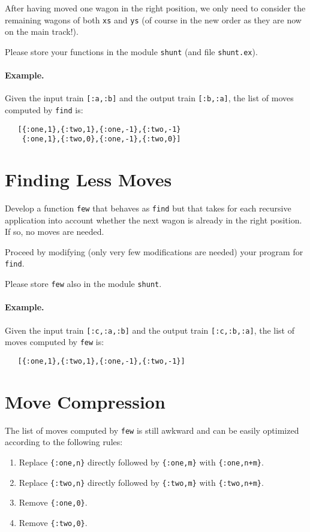 \documentclass[a4paper,11pt]{article}
\begin{document}
After having moved one wagon in the right position, we only need
to consider the remaining wagons of both \verb+xs+ and \verb+ys+
(of course in the new order as they are now on the main track!).

Please store your functions in the module \verb+shunt+ (and file
\verb+shunt.ex+).


\paragraph{Example.}
Given the input train \verb+[:a,:b]+ and the output train \verb+[:b,:a]+, the
list of moves computed by \verb+find+ is:
\begin{verbatim}
   [{:one,1},{:two,1},{:one,-1},{:two,-1} 
    {:one,1},{:two,0},{:one,-1},{:two,0}]
\end{verbatim}




\section{Finding Less Moves}

Develop a function \verb+few+ that behaves as \verb+find+ but
that takes for each recursive application into account whether
the next wagon is already in the right position. If so, no moves
are needed.

Proceed by modifying (only very few modifications are needed)
your program for \verb+find+.

Please store \verb+few+ also in the module \verb+shunt+.

\paragraph{Example.}
Given the input train \verb+[:c,:a,:b]+ and the output train
\verb+[:c,:b,:a]+, the list of moves computed by \verb+few+ is:
\begin{verbatim}
   [{:one,1},{:two,1},{:one,-1},{:two,-1}]
\end{verbatim}


\section{Move Compression}

The list of moves computed by \verb+few+ is still awkward and
can be easily optimized according to the following rules:
\begin{enumerate}
\item Replace \verb+{:one,n}+ directly followed by \verb+{:one,m}+ with
  \verb-{:one,n+m}-.
\item Replace \verb+{:two,n}+ directly followed by \verb+{:two,m}+ with
  \verb-{:two,n+m}-.
\item Remove \verb+{:one,0}+.
\item Remove \verb+{:two,0}+.
\end{enumerate}
\end{document}
